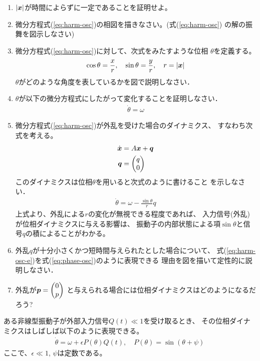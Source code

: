 \documentclass[twocolumn,11pt]{jarticle}
\begin{document}
\begin{enumerate}
\item $|\boldsymbol{x}|$が時間によらずに一定であることを証明せよ。
\item 微分方程式(\ref{eq:harm-osc})の相図を描きなさい。(式(\ref{eq:harm-osc})
  の解の振舞を図示しなさい)
\item 微分方程式(\ref{eq:harm-osc})に対して、次式をみたすような位相
  $\theta$を定義する。
  \begin{align}
    \cos\theta=\frac{x}{r},\quad
    \sin\theta=\frac{y}{r},\quad
    r=|\boldsymbol{x}|
  \end{align}
  $\theta$がどのような角度を表しているかを図で説明しなさい．
\item $\theta$が以下の微分方程式にしたがって変化することを証明しなさい．
  \begin{align}
    \dot{\theta}=\omega
  \end{align}
\item 微分方程式(\ref{eq:harm-osc})が外乱を受けた場合のダイナミクス、
  すなわち次式を考える。
  \begin{align}
    \label{eq:harm-osc-e}
    \dot{\boldsymbol{x}}&=A\boldsymbol{x}+\boldsymbol{q}\\
    \boldsymbol{q}&=
    \begin{pmatrix}
      q\\0
    \end{pmatrix}
  \end{align}
  このダイナミクスは位相$\theta$を用いると次式のように書けること
  を示しなさい．
  \begin{align}
    \label{eq:phase-osc}
    \dot{\theta}=\omega-\frac{\sin\theta}{r}q
  \end{align}
  \comment
  上式より、外乱による$r$の変化が無視できる程度であれば、
  入力信号(外乱)が位相ダイナミクスに与える影響は、
  振動子の内部状態による項$\sin\theta$と信号$q$の積によることがわかる。
\item 外乱$q$が十分小さくかつ短時間与えられたとした場合について、
   式(\ref{eq:harm-osc-e})を式(\ref{eq:phase-osc})のように表現できる
   理由を図を描いて定性的に説明しなさい．
 \item 外乱が$
    \boldsymbol{p}=
    \begin{pmatrix}
      0 \\ p
    \end{pmatrix}$
    と与えられる場合には位相ダイナミクスはどのようになるだろう?
\end{enumerate}

\comment
ある非線型振動子が外部入力信号$Q(t)\ll 1$を受け取るとき、
その位相ダイナミクスはしばしば以下のように表現できる。
\begin{align}
  \dot{\theta}=\omega+\epsilon P(\theta)Q(t),\quad
  P(\theta)=\sin(\theta+\psi)
\end{align}
ここで、$\epsilon\ll 1$, $\psi$は定数である。
\end{document}
